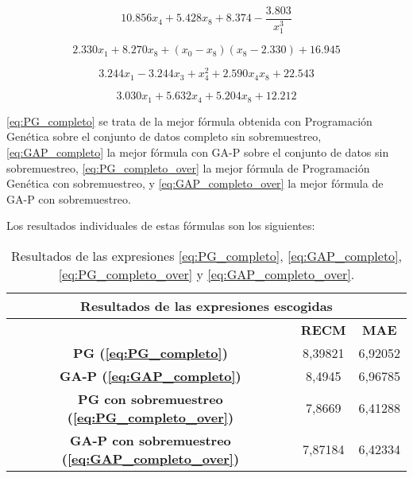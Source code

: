 \begin{equation} \label{eq:PG_completo}
10.856 x_{4} + 5.428 x_{8} + 8.374 - \frac{3.803}{x_{1}^{3}}
\end{equation}


\begin{equation} \label{eq:GAP_completo}
2.330 x_{1} + 8.270 x_{8} + \left(x_{0} - x_{8}\right) \left(x_{8} - 2.330\right) + 16.945
\end{equation}


\begin{equation} \label{eq:PG_completo_over}
3.244 x_{1} - 3.244 x_{3} + x_{4}^{2} + 2.590 x_{4} x_{8} + 22.543
\end{equation}


\begin{equation} \label{eq:GAP_completo_over}
3.030 x_{1} + 5.632 x_{4} + 5.204 x_{8} + 12.212
\end{equation}

\ref{eq:PG_completo} se trata de la mejor fórmula obtenida con Programación Genética sobre el conjunto de datos completo sin sobremuestreo, \ref{eq:GAP_completo} la mejor fórmula con GA-P sobre el conjunto de datos sin sobremuestreo, \ref{eq:PG_completo_over} la mejor fórmula de Programación Genética con sobremuestreo, y \ref{eq:GAP_completo_over} la mejor fórmula de GA-P con sobremuestreo.

Los resultados individuales de estas fórmulas son los siguientes:


\begin{table}[H]
\centering
\begin{tabular}{|c|c|c|}
\hline
\multicolumn{3}{|c|}{\textbf{Resultados de las expresiones escogidas}}   \\ \hline
\textbf{}                       & \textbf{RECM}    & \textbf{MAE}        \\ \hline
\textbf{PG (\ref{eq:PG_completo})}                     & 8,39821          & 6,92052             \\ \hline
\textbf{GA-P (\ref{eq:GAP_completo})}                   & 8,4945           & 6,96785             \\ \hline
\textbf{PG con sobremuestreo (\ref{eq:PG_completo_over})}   & 7,8669           & 6,41288             \\ \hline
\textbf{GA-P con sobremuestreo (\ref{eq:GAP_completo_over})} & 7,87184          & 6,42334             \\ \hline
\end{tabular}%
\caption{Resultados de las expresiones \ref{eq:PG_completo}, \ref{eq:GAP_completo}, \ref{eq:PG_completo_over} y \ref{eq:GAP_completo_over}.}\label{table:resultados_escogidas}
\end{table}

